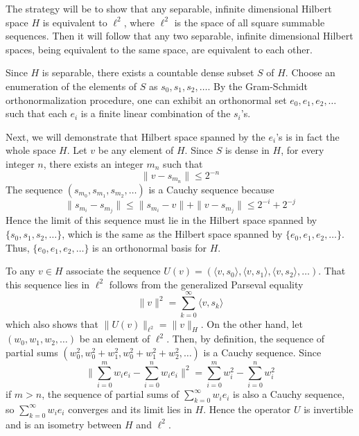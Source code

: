 \documentclass[12pt]{article}
\begin{document}
The strategy will be to show that any separable, infinite
dimensional Hilbert space $H$ is equivalent to $\ell^2$, where
$\ell^2$ is the space of all square summable sequences.  Then it
will follow that any two separable, infinite dimensional Hilbert
spaces, being equivalent to the same space, are equivalent to each
other.

Since $H$ is separable, there exists a countable dense subset $S$ of
$H$.  Choose an enumeration of the elements of $S$ as $s_0, s_1,
s_2, \ldots$.  By the Gram-Schmidt orthonormalization procedure, one
can exhibit an orthonormal set $e_0, e_1, e_2, \ldots$ such that
each $e_i$ is a finite linear combination of the $s_i$'s.

Next, we will demonstrate that Hilbert space spanned by the $e_i$'s
is in fact the whole space $H$.  Let $v$ be any element of $H$.
Since $S$ is dense in $H$, for every integer $n$, there exists an
integer $m_n$ such that
 $$\| v - s_{m_n} \| \le 2^{-n}$$
The sequence $(s_{m_0}, s_{m_1}, s_{m_2}, \ldots)$ is a Cauchy
sequence because
 $$\| s_{m_i} - s_{m_j} \| \le \| s_{m_i} - v\| + \|
v - s_{m_j} \| \le 2^{-i} + 2^{-j}$$
 Hence the limit of this sequence must lie in the Hilbert space spanned by
$\{s_0, s_1,  s_2, \ldots\}$, which is the same as the Hilbert space
spanned by $\{e_0, e_1, e_2, \ldots\}$.  Thus, $\{e_0, e_1, e_2,
\ldots\}$ is an orthonormal basis for $H$.

To any $v \in H$ associate the sequence $U(v) = ( \langle v, s_0
\rangle, \langle v, s_1 \rangle, \langle v, s_2 \rangle, \ldots )$.
That this sequence lies in $\ell^2$ follows from the generalized Parseval equality
 $$\|v\|^2 = \sum_{k=0}^\infty \langle v, s_k \rangle$$
which also shows that $\|U(v)\|_{\ell^2} = \|v\|_H$.  On the other
hand, let $(w_0, w_1, w_2, \ldots)$ be an element of $\ell^2$. Then,
by definition, the sequence of partial sums $(w_0^2, w_0^2 + w_1^2,
w_0^2 + w_1^2 + w_2^2, \ldots)$ is a Cauchy sequence.  Since
 $$\| \sum_{i=0}^m w_i e_i - \sum_{i=0}^n w_i e_i \|^2 = \sum_{i=0}^m w_i^2 -
 \sum_{i=0}^n w_i^2$$
 if $m>n$, the sequence of partial sums of $\sum_{k=0}^\infty w_i e_i$
is also a Cauchy sequence, so $\sum_{k=0}^\infty w_i e_i$ converges
and its limit lies in $H$.  Hence the operator $U$ is invertible and
is an isometry between $H$ and $\ell^2$.
\end{document}

